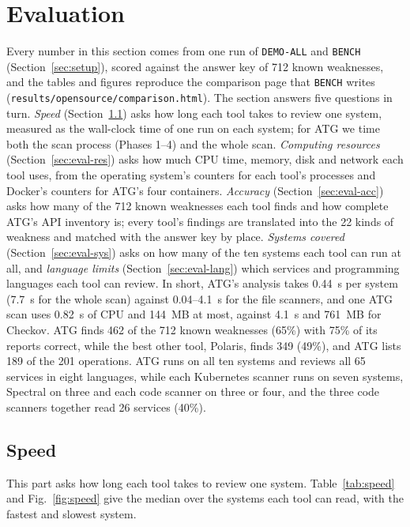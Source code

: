 \section{Evaluation}\label{sec:eval}
Every number in this section comes from one run of \texttt{DEMO-ALL} and \texttt{BENCH} (Section~\ref{sec:setup}), scored against the answer key of 712 known weaknesses, and the tables and figures reproduce the comparison page that \texttt{BENCH} writes (\texttt{results/opensource/comparison.html}). The section answers five questions in turn. \textit{Speed} (Section~\ref{sec:eval-speed}) asks how long each tool takes to review one system, measured as the wall-clock time of one run on each system; for ATG we time both the scan process (Phases 1--4) and the whole scan. \textit{Computing resources} (Section~\ref{sec:eval-res}) asks how much CPU time, memory, disk and network each tool uses, from the operating system's counters for each tool's processes and Docker's counters for ATG's four containers. \textit{Accuracy} (Section~\ref{sec:eval-acc}) asks how many of the 712 known weaknesses each tool finds and how complete ATG's API inventory is; every tool's findings are translated into the 22 kinds of weakness and matched with the answer key by place. \textit{Systems covered} (Section~\ref{sec:eval-sys}) asks on how many of the ten systems each tool can run at all, and \textit{language limits} (Section~\ref{sec:eval-lang}) which services and programming languages each tool can review. In short, ATG's analysis takes 0.44~s per system (7.7~s for the whole scan) against 0.04--4.1~s for the file scanners, and one ATG scan uses 0.82~s of CPU and 144~MB at most, against 4.1~s and 761~MB for Checkov. ATG finds 462 of the 712 known weaknesses (65\%) with 75\% of its reports correct, while the best other tool, Polaris, finds 349 (49\%), and ATG lists 189 of the 201 operations. ATG runs on all ten systems and reviews all 65 services in eight languages, while each Kubernetes scanner runs on seven systems, Spectral on three and each code scanner on three or four, and the three code scanners together read 26 services (40\%).

\FloatBarrier
\subsection{Speed}\label{sec:eval-speed}
This part asks how long each tool takes to review one system. Table~\ref{tab:speed} and Fig.~\ref{fig:speed} give the median over the systems each tool can read, with the fastest and slowest system.

